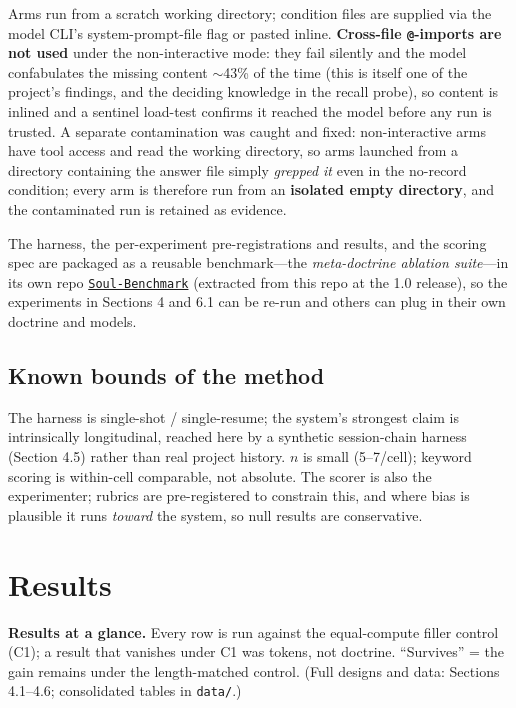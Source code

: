 \documentclass[11pt]{article}
\begin{document}
Arms run from a scratch working directory; condition files are supplied via the model
CLI's system-prompt-file flag or pasted inline. \textbf{Cross-file \texttt{@}-imports are not used}
under the non-interactive mode: they fail silently and the model confabulates the
missing content $\sim$43\% of the time (this is itself one of the project's findings, and the
deciding knowledge in the recall probe), so content is inlined and a sentinel
load-test confirms it reached the model before any run is trusted. A separate
contamination was caught and fixed: non-interactive arms have tool access and read the
working directory, so arms launched from a directory containing the answer file simply
\emph{grepped it} even in the no-record condition; every arm is therefore run from an
\textbf{isolated empty directory}, and the contaminated run is retained as evidence.

The harness, the per-experiment pre-registrations and results, and the scoring spec are
packaged as a reusable benchmark---the \emph{meta-doctrine ablation suite}---in its own repo
\href{https://github.com/soul-system-works/Soul-Benchmark}{\texttt{Soul-Benchmark}} (extracted from
this repo at the 1.0 release), so the experiments in Sections 4 and 6.1 can be re-run
and others can plug in their own doctrine and models.

\subsection{Known bounds of the method}

The harness is single-shot / single-resume; the system's strongest claim is
intrinsically longitudinal, reached here by a synthetic session-chain harness
(Section 4.5) rather than real project history. $n$ is small (5--7/cell); keyword scoring
is within-cell comparable, not absolute. The scorer is also the experimenter; rubrics
are pre-registered to constrain this, and where bias is plausible it runs \emph{toward} the
system, so null results are conservative.

\section{Results}

\textbf{Results at a glance.} Every row is run against the equal-compute filler control (C1); a
result that vanishes under C1 was tokens, not doctrine. ``Survives'' = the gain remains under
the length-matched control. (Full designs and data: Sections 4.1--4.6; consolidated tables in
\texttt{data/}.)
\end{document}
